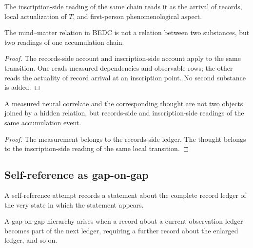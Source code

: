 \begin{definition}
\label{def:philosophy-inscription-side}
The inscription-side reading of the same chain reads it as the arrival
of records, local actualization of \(T\), and first-person
phenomenological aspect.
\end{definition}

\begin{theorem}
\label{thm:philosophy-mind-matter-not-two-substance}
The mind--matter relation in BEDC is not a relation between two
substances, but two readings of one accumulation chain.
\end{theorem}
\begin{proof}
The records-side account and inscription-side account apply to the
same transition. One reads measured dependencies and observable rows;
the other reads the actuality of record arrival at an inscription
point. No second substance is added.
\end{proof}

\begin{corollary}
\label{cor:philosophy-neural-correlate-thought-double-reading}
A measured neural correlate and the corresponding thought are not two
objects joined by a hidden relation, but records-side and
inscription-side readings of the same accumulation event.
\end{corollary}
\begin{proof}
The measurement belongs to the records-side ledger. The thought belongs
to the inscription-side reading of the same local transition.
\end{proof}

\subsection{Self-reference as gap-on-gap}
\label{subsec:philosophy-self-reference-gap-on-gap}

\begin{definition}
\label{def:philosophy-self-reference-attempt}
A self-reference attempt records a statement about the complete record
ledger of the very state in which the statement appears.
\end{definition}

\begin{definition}
\label{def:philosophy-gap-on-gap-hierarchy}
A gap-on-gap hierarchy arises when a record about a current observation
ledger becomes part of the next ledger, requiring a further record
about the enlarged ledger, and so on.
\end{definition}

